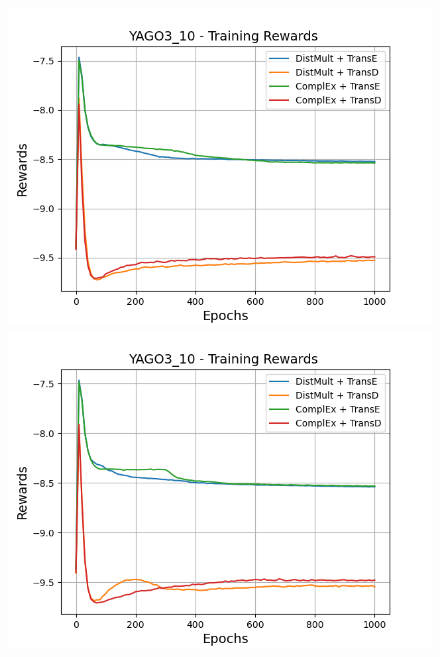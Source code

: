 \begin{figure}[H]
    \centering
    \begin{minipage}{.45\textwidth}
      \centering
      \includegraphics[width=0.9\linewidth]{figures/results/gan_train/not_pretrained/uncertainty/max_distribution/entropy/yago3_10/1k_epochs/uncertainty_yago3_10_rew.png}
    \end{minipage}%
    \begin{minipage}{.45\textwidth}
      \centering
      \includegraphics[width=0.9\linewidth]{figures/results/gan_train/not_pretrained/uncertainty/max_distribution/least_confidence/yago3_10/uncertainty_yago3_10_rew.png}
    \end{minipage}
    \begin{minipage}{.45\textwidth}
      \centering

\end{minipage}
\end{figure}
